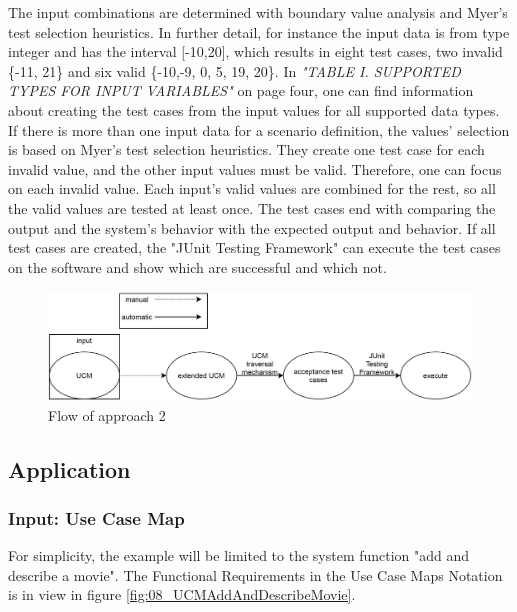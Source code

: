 The input combinations are determined with boundary value analysis and Myer's test selection heuristics. In further detail, for instance the input data is from type integer and has the interval [-10,20], which results in eight test cases, two invalid \{-11, 21\} and six valid \{-10,-9, 0, 5, 19, 20\}. In \textit{"TABLE I. SUPPORTED TYPES FOR INPUT VARIABLES"} on page four, one can find information about creating the test cases from the input values for all supported data types. If there is more than one input data for a scenario definition, the values' selection is based on Myer's test selection heuristics. They create one test case for each invalid value, and the other input values must be valid. Therefore, one can focus on each invalid value. Each input's valid values are combined for the rest, so all the valid values are tested at least once. The test cases end with comparing the output and the system's behavior with the expected output and behavior. If all test cases are created, the "JUnit Testing Framework" can execute the test cases on the software and show which are successful and which not.

\begin{figure}[h]
	\centering
	\includegraphics[scale=0.4]{../images/08/08_controllFlow2.jpg} 
	\caption{Flow of approach 2}
	\label{fig:08_flowOf2}
\end{figure}
\subsection{Application}

\subsubsection{Input: Use Case Map}

For simplicity, the example will be limited to the system function "add and describe a movie". The Functional Requirements in the Use Case Maps Notation is in view in figure \ref{fig:08_UCMAddAndDescribeMovie}.


